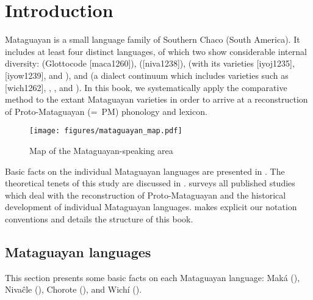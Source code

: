 \chapter{Introduction}

Mataguayan is a small language family of Southern Chaco (South America). It includes at least four distinct languages, of which two show considerable internal diversity:  (Glottocode [maca1260]),  ([niva1238]),  (with its varieties  [iyoj1235],  [iyow1239], and ), and  (a dialect continuum which includes varieties such as  [wich1262], , , and ). In this book, we systematically apply the comparative method to the extant Mataguayan varieties in order to arrive at a reconstruction of Proto-Mataguayan (=~PM) phonology and lexicon.

\begin{sidewaysfigure}
\texttt{[image: figures/mataguayan\_map.pdf]}
\caption{Map of the Mataguayan-speaking area}
\label{fig-map}
\end{sidewaysfigure}

Basic facts on the individual Mataguayan languages are presented in . The theoretical tenets of this study are discussed in .  surveys all published studies which deal with the reconstruction of Proto-Mataguayan and the historical development of individual Mataguayan languages.  makes explicit our notation conventions and  details the structure of this book.

\section{Mataguayan languages} \label{intro-mataguayan}
\sloppy
This section presents some basic facts on each Mataguayan language: Maká (), Nivaĉle (), Chorote (), and Wichí ().
\fussy

